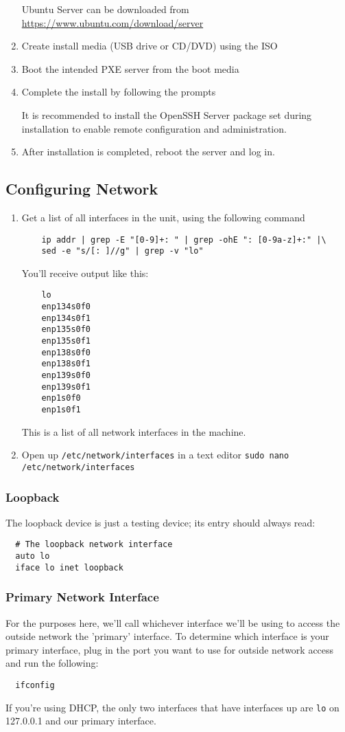 \documentclass{article}
\begin{document}
\begin{flushleft}
\begin{enumerate}
  Ubuntu Server can be downloaded from \url{https://www.ubuntu.com/download/server}
  \item Create install media (USB drive or CD/DVD) using the ISO
  \item Boot the intended PXE server from the boot media
  \item Complete the install by following the prompts

  It is recommended to install the OpenSSH Server package set during installation to enable remote configuration and administration.

  \item After installation is completed, reboot the server and log in.
\end{enumerate}
\subsection{Configuring Network}
\begin{enumerate}
  \item Get a list of all interfaces in the unit, using the following command
  \begin{verbatim}
    ip addr | grep -E "[0-9]+: " | grep -ohE ": [0-9a-z]+:" |\
    sed -e "s/[: ]//g" | grep -v "lo"
  \end{verbatim}

  You'll receive output like this:
  \begin{verbatim}
    lo
    enp134s0f0
    enp134s0f1
    enp135s0f0
    enp135s0f1
    enp138s0f0
    enp138s0f1
    enp139s0f0
    enp139s0f1
    enp1s0f0
    enp1s0f1
  \end{verbatim}

  This is a list of all network interfaces in the machine.
  \item Open up \verb|/etc/network/interfaces| in a text editor
  \verb|sudo nano /etc/network/interfaces|
\end{enumerate}
\subsubsection{Loopback}
The loopback device is just a testing device; its entry should always read:

\begin{verbatim}
  # The loopback network interface
  auto lo
  iface lo inet loopback
\end{verbatim}
\subsubsection{Primary Network Interface}
For the purposes here, we'll call whichever interface we'll be using to access the outside network the 'primary' interface.  To determine which interface is your primary interface, plug in the port you want to use for outside network access and run the following:
\begin{verbatim}
  ifconfig
\end{verbatim}
If you're using DHCP, the only two interfaces that have interfaces up are \verb|lo| on 127.0.0.1 and our primary interface.


\end{flushleft}
\end{document}
